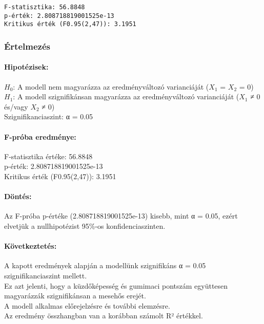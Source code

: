 \documentclass[11pt]{article}
\begin{document}
    \begin{Verbatim}[commandchars=\\\{\}]
F-statisztika: 56.8848
p-érték: 2.808718819001525e-13
Kritikus érték (F0.95(2,47)): 3.1951
    \end{Verbatim}

    \subsubsection{Értelmezés}\label{uxe9rtelmezuxe9s}

\paragraph{Hipotézisek:}\label{hipotuxe9zisek}

$H_0$: A modell nem magyarázza az eredményváltozó varianciáját ($X_1$ = $X_2$ =
0)\\
$H_1$: A modell szignifikánsan magyarázza az eredményváltozó varianciáját
($X_1$ ≠ 0 és/vagy $X_2$ ≠ 0)\\
Szignifikanciaszint: α = 0.05

\paragraph{F-próba eredménye:}\label{f-pruxf3ba-eredmuxe9nye}

F-statisztika értéke: 56.8848\\
p-érték: 2.808718819001525e-13\\
Kritikus érték (F0.95(2,47)): 3.1951

\paragraph{Döntés:}\label{duxf6ntuxe9s}

Az F-próba p-értéke (2.808718819001525e-13) kisebb, mint α = 0.05, ezért
elvetjük a nullhipotézist 95\%-os konfidenciaszinten.

\paragraph{Következtetés:}\label{kuxf6vetkeztetuxe9s}

A kapott eredmények alapján a modellünk szignifikáns α = 0.05
szignifikanciaszint mellett.\\
Ez azt jelenti, hogy a küzdőképesség és gumimaci pontszám együttesen
magyarázzák szignifikánsan a mesehős erejét.\\
A modell alkalmas előrejelzésre és további elemzésre.\\
Az eredmény összhangban van a korábban számolt R² értékkel.
\end{document}
